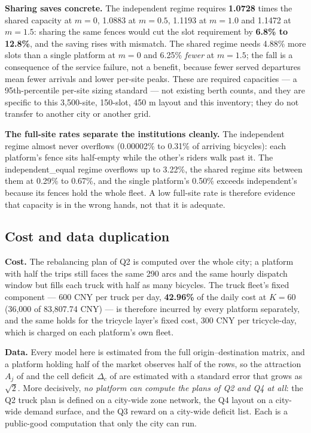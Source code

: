 \textbf{Sharing saves concrete.} The independent regime requires \textbf{1.0728} times
the shared capacity at $m=0$, 1.0883 at $m=0.5$, 1.1193 at $m=1.0$ and 1.1472 at
$m=1.5$: sharing the same fences would cut the slot requirement by \textbf{6.8\% to
12.8\%}, and the saving rises with mismatch. The shared regime needs 4.88\% more slots than a single platform at
$m=0$ and 6.25\% \emph{fewer} at $m=1.5$; the fall is a consequence of the service
failure, not a benefit, because fewer served departures mean fewer arrivals and lower
per-site peaks. These are required capacities --- a 95th-percentile per-site sizing
standard --- not existing berth counts, and they are specific to this 3,500-site,
150-slot, 450 m layout and this inventory; they do not transfer to another city or
another grid.

\textbf{The full-site rates separate the institutions cleanly.} The independent regime
almost never overflows (0.00002\% to 0.31\% of arriving bicycles): each platform's fence
sits half-empty while the other's riders walk past it. The independent\_equal regime
overflows up to 3.22\%, the shared regime sits between them at 0.29\% to 0.67\%, and the
single platform's 0.50\% exceeds independent's because its fences hold the whole fleet.
A low full-site rate is therefore evidence that capacity is in the wrong hands, not that
it is adequate.

\subsection{Cost and data duplication}

\textbf{Cost.} The rebalancing plan of Q2 is computed over the whole city; a platform
with half the trips still faces the same 290 arcs and the same hourly dispatch
window but fills each truck with half as many bicycles. The truck fleet's fixed
component --- 600 CNY
per truck per day, \textbf{42.96\%} of the daily cost at $K=60$ (36,000 of 83,807.74
CNY) --- is therefore incurred by every platform separately, and the same holds for
the tricycle layer's fixed cost, 300 CNY per tricycle-day, which is charged on each
platform's own fleet.

\textbf{Data.} Every model here is
estimated from the full origin--destination matrix, and a platform holding half of
the market observes half of the rows, so the attraction $A_j$ of
 and the cell deficit $\Delta_c$ of  are estimated
with a standard error that grows as $\sqrt{2}$. More decisively, \emph{no platform can
compute the plans of Q2 and Q4 at all}: the Q2 truck plan is defined on a city-wide
zone network, the Q4 layout on a city-wide demand surface, and the Q3 reward on a
city-wide deficit list. Each is a public-good computation that only the city can run.

